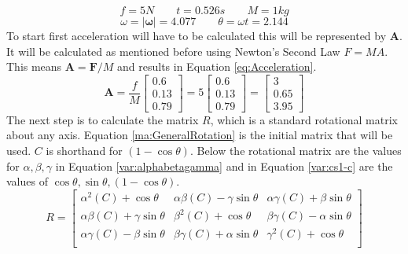 \begin{equation}\label{var:ftm}
	f = 5N
	\qquad
	t = 0.526s
	\qquad
	M = 1kg
\end{equation}
\begin{equation}\label{var:thetaomega}
	\omega = |\boldsymbol\omega| = 4.077
	\qquad
	\theta = \omega t = 2.144
\end{equation}
To start first acceleration will have to be calculated this will be represented by $\mathbf{A}$.
It will be calculated as mentioned before using Newton’s Second Law $F=MA$.
This means $\mathbf{A} = \mathbf{F}/M$ and results in Equation \ref{eq:Acceleration}.
\begin{equation}\label{eq:Acceleration}
	\mathbf{A} = \frac{f}{M}
	\begin{bmatrix}
		 0.6  \\
		 0.13 \\
		 0.79 
	\end{bmatrix} = 5
	\begin{bmatrix}
		 0.6  \\
		 0.13 \\
		 0.79 
	\end{bmatrix} = 
	\begin{bmatrix}
		 3  \\
		 0.65 \\
		 3.95 
	\end{bmatrix}
\end{equation}
The next step is to calculate the matrix $R$, which is a standard rotational matrix about any axis.
Equation \ref{ma:GeneralRotation} is the initial matrix that will be used. $C$ is shorthand for $(1-\cos\theta)$.
Below the rotational matrix are the values for $\alpha, \beta, \gamma$ in Equation \ref{var:alphabetagamma} and in Equation \ref{var:cs1-c} are the values of $\cos\theta, \sin\theta, (1-\cos\theta)$.
\begin{equation}\label{ma:GeneralRotation}
	R = 
	\begin{bmatrix}
		{\alpha}^{2}(C) + \cos\theta & 
		\alpha\beta(C) - \gamma\sin\theta & 
		\alpha\gamma(C) + \beta\sin\theta \\
		
		\alpha\beta(C) + \gamma\sin\theta & 
		{\beta}^{2}(C) + \cos\theta & 
		\beta\gamma(C) - \alpha\sin\theta \\
		
		\alpha\gamma(C) - \beta\sin\theta & 
		\beta\gamma(C) + \alpha\sin\theta & 
		{\gamma}^{2}(C) + \cos\theta \\
	\end{bmatrix}
\end{equation}
